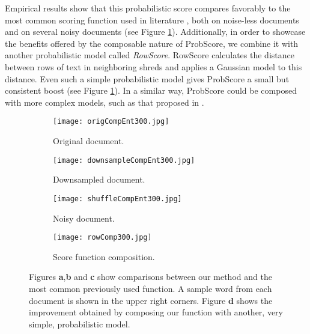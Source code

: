 \documentclass{llncs}
\begin{document}
Empirical results show that this probabilistic score compares favorably to the most common scoring function used in literature \cite{P7}, both on noise-less documents and on several noisy documents (see Figure \ref{fig:scoreComp}). Additionally, in order to showcase the benefits offered by the composable nature of ProbScore, we combine it with another probabilistic model called \emph{RowScore}. RowScore calculates the distance between rows of text in neighboring shreds and applies a Gaussian model to this distance. Even such a simple probabilistic model gives ProbScore a small but consistent boost (see Figure \ref{fig:scoreComp}). In a similar way, ProbScore could be composed with more complex models, such as that proposed in \cite{P8}.
\begin{figure}[h]
    \setlength{\abovecaptionskip}{4pt plus 1.0pt minus 2.0pt}
    \centering
    \begin{subfigure}[b]{0.48\textwidth}
        \setlength{\abovecaptionskip}{1pt plus 1.0pt minus 2.0pt}
        \centering
        \texttt{[image: origCompEnt300.jpg]}
        \caption{Original document.}
    \end{subfigure}
    \begin{subfigure}[b]{0.48\textwidth}
        \setlength{\abovecaptionskip}{1pt plus 1.0pt minus 2.0pt}
        \centering
        \texttt{[image: downsampleCompEnt300.jpg]}
        \caption{Downsampled document.}
    \end{subfigure}
    \begin{subfigure}[b]{0.48\textwidth}
        \setlength{\abovecaptionskip}{1pt plus 1.0pt minus 2.0pt}
        \centering
        \texttt{[image: shuffleCompEnt300.jpg]}
        \caption{Noisy document.}
    \end{subfigure}
    \begin{subfigure}[b]{0.48\textwidth}
        \setlength{\abovecaptionskip}{1pt plus 1.0pt minus 2.0pt}
        \centering
        \texttt{[image: rowComp300.jpg]}
        \caption{Score function composition.}
    \end{subfigure}
     \caption{Figures {\bf a},{\bf b} and {\bf c} show comparisons between our method and the most common previously used function. A sample word from each document is shown in the upper right corners. Figure {\bf d} shows the improvement obtained by composing our function with another, very simple, probabilistic model.}
    \label{fig:scoreComp}
\end{figure}
\end{document}
